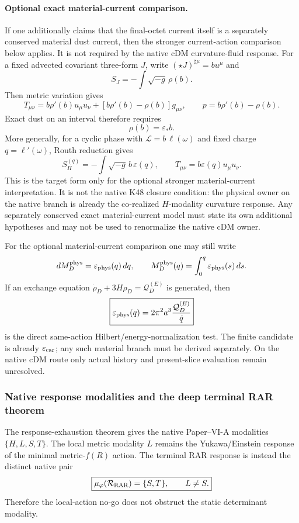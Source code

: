 \documentclass[12pt,a4paper]{article}
\begin{document}
\paragraph{Optional exact material-current comparison.}
If one additionally claims that the final-octet current itself is a separately
conserved material dust current, then the stronger current-action comparison
below applies.  It is not required by the native cDM curvature-fluid response.
For a fixed advected covariant three-form $J$, write
$(\star J)^{\sharp\mu}=bu^\mu$ and
\[
 S_J=-\int\sqrt{-g}\,\rho(b).
\]
Then metric variation gives
\[
 \boxed{T_{\mu\nu}=b\rho'(b)u_\mu u_\nu+
 [b\rho'(b)-\rho(b)]g_{\mu\nu}},
 \qquad p=b\rho'(b)-\rho(b).
\]
Exact dust on an interval therefore requires
\[
 \boxed{\rho(b)=\varepsilon_*b.}
\]
More generally, for a cyclic phase with
$\mathscr L=b\,\ell(\omega)$ and fixed charge $q=\ell'(\omega)$, Routh reduction
gives
\[
 S_H^{(q)}=-\int\sqrt{-g}\,b\,\varepsilon(q),
 \qquad
 T_{\mu\nu}=b\varepsilon(q)u_\mu u_\nu.
\]
This is the target form only for the optional stronger material-current
interpretation.  It is not the native K48 closure condition: the physical
owner on the native branch is already the co-realized $H$-modality curvature
response.  Any separately conserved exact material-current model must state its
own additional hypotheses and may not be used to renormalize the native cDM
owner.

For the optional material-current comparison one may still write
\[
 dM_D^{\rm phys}=\varepsilon_{\rm phys}(q)\,dq,
 \qquad M_D^{\rm phys}(q)=\int_0^q\varepsilon_{\rm phys}(s)\,ds.
\]
If an exchange equation
$\dot\rho_D+3H\rho_D=\mathcal Q_D^{(E)}$ is generated, then
\[
 \boxed{\varepsilon_{\rm phys}(q)=2\pi^2a^3
 \frac{\mathcal Q_D^{(E)}}{\dot q}}
\]
is the direct same-action Hilbert/energy-normalization test.  The finite candidate is already $\varepsilon_{\rm car}$; any such material
branch must be derived separately.  On the native cDM route only actual history
and present-slice evaluation remain unresolved.

\subsubsection{Native response modalities and the deep terminal RAR theorem}
The response-exhaustion theorem gives the native Paper--VI-A modalities
$\{H,L,S,T\}$.  The local metric modality $L$ remains the Yukawa/Einstein
response of the minimal metric-$f(R)$ action.  The terminal RAR response is
instead the distinct native pair
\[
 \boxed{\mu_\varphi(\mathcal R_{\rm RAR})=\{S,T\},\qquad L\ne S.}
\]
Therefore the local-action no-go does not obstruct the static determinant
modality.
\end{document}
